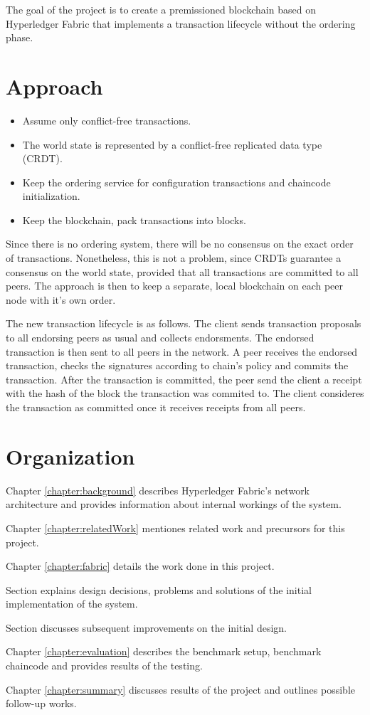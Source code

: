 The goal of the project is to create a premissioned blockchain based on Hyperledger Fabric that implements a transaction lifecycle without the ordering phase.

\section{Approach}
 \label{sec:approach}

\begin{itemize}
  \item Assume only conflict-free transactions.
  \item The world state is represented by a conflict-free replicated data type (CRDT).
  \item Keep the ordering service for configuration transactions and chaincode initialization.
  \item Keep the blockchain, pack transactions into blocks.
\end{itemize}

 Since there is no ordering system, there will be no consensus on the exact order of transactions. Nonetheless, this is not a problem, since CRDTs guarantee a consensus on the world state, provided that all transactions are committed to all peers. The approach is then to keep a separate, local blockchain on each peer node with it's own order.

 The new transaction lifecycle is as follows.
 The client sends transaction proposals to all endorsing peers as usual and collects endorsments. The endorsed transaction is then sent to all peers in the network. A peer receives the endorsed transaction, checks the signatures according to chain's policy and commits the transaction. After the transaction is committed, the peer send the client a receipt with the hash of the block the transaction was commited to. The client consideres the transaction as committed once it receives receipts from all peers.

\section{Organization}
 \label{sec:organization}
 Chapter \ref{chapter:background} describes Hyperledger Fabric's network architecture and provides information about internal workings of the system.

 Chapter \ref{chapter:relatedWork} mentiones related work and precursors for this project.

 Chapter \ref{chapter:fabric} details the work done in this project.

 \setlength{\parindent}{1em}
 \indent Section  explains design decisions, problems and solutions of the initial implementation of the system.

 \indent Section  discusses subsequent improvements on the initial design.
 \setlength{\parindent}{0pt}

 Chapter \ref{chapter:evaluation} describes the benchmark setup, benchmark chaincode and provides results of the testing.

 Chapter \ref{chapter:summary} discusses results of the project and outlines possible follow-up works.
